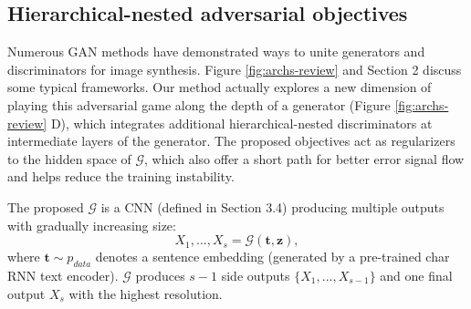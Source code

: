 \documentclass[10pt,twocolumn,letterpaper]{article}
\begin{document}
\subsection{Hierarchical-nested adversarial objectives}
Numerous GAN methods have demonstrated ways to unite generators and discriminators for image synthesis. Figure \ref{fig:archs-review} and Section 2 discuss some typical frameworks.
Our method actually explores a new dimension of playing this adversarial game along the depth of a generator (Figure \ref{fig:archs-review} D), which integrates additional hierarchical-nested  discriminators at intermediate layers of the generator. 
The proposed objectives act as regularizers to the hidden space of $\mathcal{G}$, which also offer a short path for better error signal flow and helps reduce the training instability.

The proposed $\mathcal{G}$ is a CNN (defined in Section 3.4) producing multiple outputs with gradually increasing size:
\begin{equation}
\label{side}
X_1,..., X_s = \mathcal{G}(\bm t, \bm z), 
\end{equation}
where  $\bm t\sim p_{data}$ denotes a sentence embedding (generated by a pre-trained char RNN text encoder\cite{reed2016generative}). $\mathcal{G}$ produces $s-1$ side outputs $\{X_1,...,X_{s-1}\}$  and one final output $X_s$ with the highest resolution.



\end{document}
